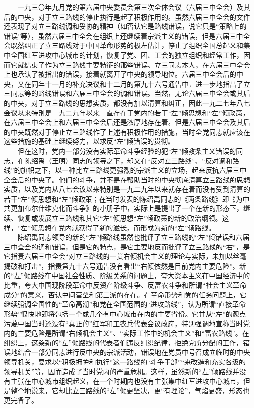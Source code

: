 \documentclass[cn,11pt,chinese]{elegantbook}
\begin{document}
　　一九三〇年九月党的第六届中央委员会第三次全体会议（六届三中全会）及其后的中央，对于立三路线的停止执行是起了积极作用的。虽然六届三中全会的文件还表现了对立三路线调和妥协的精神（如否认它是路线错误，说它只是“策略上的错误”等），虽然六届三中全会在组织上还继续着宗派主义的错误，但是六届三中全会既然纠正了立三路线对于中国革命形势的极左估计，停止了组织全国总起义和集中全国红军进攻中心城市的计划，恢复了党、团、工会的独立组织和经常工作，因而它就结束了作为立三路线主要特征的那些错误。立三同志本人，在六届三中全会上也承认了被指出的错误，接着就离开了中央的领导地位。六届三中全会后的中央，又在同年十一月的补充决议和十二月的第九十六号通告中，进一步地指出了立三同志等的路线错误和六届三中全会的调和错误。当然，无论六届三中全会或其后的中央，对于立三路线的思想实质，都没有加以清算和纠正，因此一九二七年八七会议以来特别是一九二九年以来一直存在于党内的若干“左”倾思想和“左”倾政策，在六届三中全会上和六届三中全会后还是浓厚地存在着。但是六届三中全会及其后的中央既然对于停止立三路线作了上述有积极作用的措施，当时全党同志就应该在这些措施的基础上继续努力，以求反“左”倾错误的贯彻。\\
　　但在这时，党内一部分没有实际革命斗争经验的犯“左”倾教条主义错误的同志，在陈绍禹（王明）同志的领导之下，却又在“反对立三路线”、“反对调和路线”的旗帜之下，以一种比立三路线更强烈的宗派主义的立场，起来反抗六届三中全会后的中央了。他们的斗争，并不是在帮助当时的中央彻底清算立三路线的思想实质，以及党内从八七会议以来特别是一九二九年以来就存在着而没有受到清算的若干“左”倾思想和“左”倾政策；在当时发表的陈绍禹同志的《两条路线》即《为中共更加布尔什维克化而斗争》的小册子中，实际上是提出了一个在新的形态下，继续、恢复或发展立三路线和其它“左”倾思想“左”倾政策的新的政治纲领。这样，“左”倾思想在党内就获得了新的滋长，而形成为新的“左”倾路线。\\
　　陈绍禹同志领导的新的“左”倾路线虽然也批评了立三路线的“左”倾错误和六届三中全会的调和错误，但是它的特点，是它主要地反而批评了立三路线的“右”，是它指责六届三中全会“对立三路线的一贯右倾机会主义的理论与实际，未加以丝毫揭破和打击”，指责第九十六号通告没有看出“右倾依然是目前党内主要危险”。新的“左”倾路线在中国社会性质、阶级关系的问题上，夸大资本主义在中国经济中的比重，夸大中国现阶段革命中反资产阶级斗争、反富农斗争和所谓“社会主义革命成分”的意义，否认中间营垒和第三派的存在。在革命形势和党的任务问题上，它继续强调全国性的“革命高潮”和党在全国范围的“进攻路线”，认为所谓“直接革命形势”很快地即将包括一个或几个有中心城市在内的主要省份。它并从“左”的观点污蔑中国当时还没有“真正的”红军和工农兵代表会议政府，特别强调地宣称当时党内的主要危险是所谓“右倾机会主义”、“实际工作中的机会主义”和“富农路线”。在组织上，这条新的“左”倾路线的代表者们违反组织纪律，拒绝党所分配的工作，错误地结合一部分同志进行反中央的宗派活动，错误地在党员中号召成立临时的中央领导机关，要求以“积极拥护和执行”这一路线的“斗争干部”“来改造和充实各级的领导机关”等，因而造成了当时党内的严重危机。这样，虽然新的“左”倾路线并没有主张在中心城市组织起义，在一个时期内也没有主张集中红军进攻中心城市，但是整个地说来，它却比立三路线的“左”倾更坚决，更“有理论”，气焰更盛，形态也更完备了。\\
\end{document}
